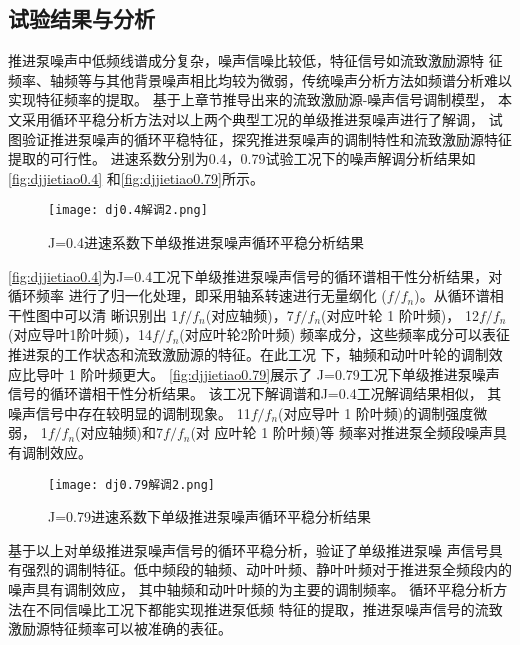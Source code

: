 \subsection{试验结果与分析}
推进泵噪声中低频线谱成分复杂，噪声信噪比较低，特征信号如流致激励源特
征频率、轴频等与其他背景噪声相比均较为微弱，传统噪声分析方法如频谱分析难以实现特征频率的提取。
基于上章节推导出来的流致激励源-噪声信号调制模型，
本文采用循环平稳分析方法对以上两个典型工况的单级推进泵噪声进行了解调，
试图验证推进泵噪声的循环平稳特征，探究推进泵噪声的调制特性和流致激励源特征提取的可行性。
进速系数分别为0.4，0.79试验工况下的噪声解调分析结果如\autoref{fig:djjietiao0.4}
和\autoref{fig:djjietiao0.79}所示。
\begin{figure}[htbp]
    \centering
    \texttt{[image: dj0.4解调2.png]}
    \caption{\label{fig:djjietiao0.4}J=0.4进速系数下单级推进泵噪声循环平稳分析结果}
\end{figure}

\autoref{fig:djjietiao0.4}为J=0.4工况下单级推进泵噪声信号的循环谱相干性分析结果，对循环频率
进行了归一化处理，即采用轴系转速进行无量纲化 ($f/f_n$)。从循环谱相干性图中可以清
晰识别出 1$f/f_n$(对应轴频)，7$f/f_n$(对应叶轮 1 阶叶频)，
12$f/f_n$(对应导叶1阶叶频)，14$f/f_n$(对应叶轮2阶叶频)
频率成分，这些频率成分可以表征推进泵的工作状态和流致激励源的特征。在此工况
下，轴频和动叶叶轮的调制效应比导叶 1 阶叶频更大。
\autoref{fig:djjietiao0.79}展示了 J=0.79工况下单级推进泵噪声信号的循环谱相干性分析结果。
该工况下解调谱和J=0.4工况解调结果相似，
其噪声信号中存在较明显的调制现象。
11$f/f_n$(对应导叶 1 阶叶频)的调制强度微弱，
1$f/f_n$(对应轴频)和7$f/f_n$(对
应叶轮 1 阶叶频)等
频率对推进泵全频段噪声具有调制效应。
\begin{figure}[htbp]
    \centering
    \texttt{[image: dj0.79解调2.png]}
    \caption{\label{fig:djjietiao0.79}J=0.79进速系数下单级推进泵噪声循环平稳分析结果}
\end{figure}

基于以上对单级推进泵噪声信号的循环平稳分析，验证了单级推进泵噪
声信号具有强烈的调制特征。低中频段的轴频、动叶叶频、静叶叶频对于推进泵全频段内的噪声具有调制效应，
其中轴频和动叶叶频的为主要的调制频率。
循环平稳分析方法在不同信噪比工况下都能实现推进泵低频
特征的提取，推进泵噪声信号的流致激励源特征频率可以被准确的表征。
\begin{comment}
\begin{figure}[htbp]
    \centering
    \texttt{[image: dj1.2解调1.png]}
    \caption{\label{fig:djjietiao1.2}J=1.2进速系数下单级推进泵噪声循环平稳分析结果}
\end{figure}
\end{comment}
